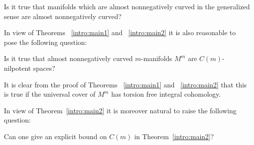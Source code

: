 \documentclass{amsart}
\begin{document}
\begin{quest}
Is it true  that  manifolds which are almost nonnegatively curved in the generalized sense
are almost nonnegatively curved?
\end{quest}


In view of Theorems ~\ref{intro:main1} and ~\ref{intro:main2} it is
also reasonable to pose the following question:

\begin{quest}
Is it true that almost nonnegatively curved $m$-manifolds $M^m$
are $C(m)$-nilpotent spaces?
\end{quest}

It is clear from the proof of Theorems ~\ref{intro:main1} and ~\ref{intro:main2}
that this is true if the universal cover
of $M^m$ has torsion free integral cohomology.

In view of Theorem~\ref{intro:main2} it is moreover natural to raise
the following question:
\begin{quest}
Can one give an explicit bound on $C(m)$ in Theorem~\ref{intro:main2}?
\end{quest}

\small

%
\end{document}
